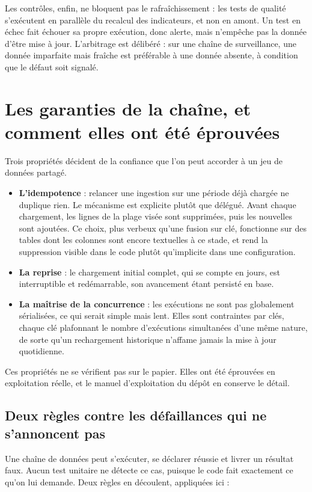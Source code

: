 Les contrôles, enfin, ne bloquent pas le rafraîchissement : les tests de qualité s'exécutent
en parallèle du recalcul des indicateurs, et non en amont. Un test en échec fait échouer sa
propre exécution, donc alerte, mais n'empêche pas la donnée d'être mise à jour. L'arbitrage est
délibéré : sur une chaîne de surveillance, une donnée imparfaite mais fraîche est préférable à
une donnée absente, à condition que le défaut soit signalé.

\section{Les garanties de la chaîne, et comment elles ont été éprouvées}

Trois propriétés décident de la confiance que l'on peut accorder à un jeu de données partagé.

\begin{itemize}
  \item \textbf{L'idempotence} : relancer une ingestion sur une période déjà chargée ne duplique
  rien. Le mécanisme est explicite plutôt que délégué. Avant chaque chargement, les lignes de la
  plage visée sont supprimées, puis les nouvelles sont ajoutées. Ce choix, plus verbeux qu'une
  fusion sur clé, fonctionne sur des tables dont les colonnes sont encore textuelles à ce stade,
  et rend la suppression visible dans le code plutôt qu'implicite dans une configuration.
  \item \textbf{La reprise} : le chargement initial complet, qui se compte en jours, est
  interruptible et redémarrable, son avancement étant persisté en base.
  \item \textbf{La maîtrise de la concurrence} : les exécutions ne sont pas globalement
  sérialisées, ce qui serait simple mais lent. Elles sont contraintes par clés, chaque clé
  plafonnant le nombre d'exécutions simultanées d'une même nature, de sorte qu'un rechargement
  historique n'affame jamais la mise à jour quotidienne.
\end{itemize}

Ces propriétés ne se vérifient pas sur le papier. Elles ont été éprouvées en exploitation réelle,
et le manuel d'exploitation du dépôt en conserve le détail.

\subsection{Deux règles contre les défaillances qui ne s'annoncent pas}

Une chaîne de données peut s'exécuter, se déclarer réussie et livrer un résultat faux. Aucun test
unitaire ne détecte ce cas, puisque le code fait exactement ce qu'on lui demande. Deux règles en
découlent, appliquées ici :

